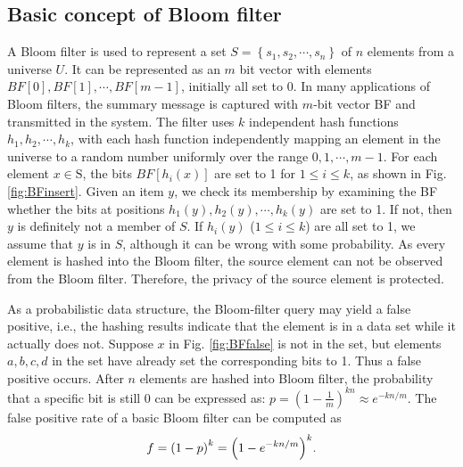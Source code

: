 \documentclass[10pt,journal,compsoc]{IEEEtran}
\begin{document}
\subsection{Basic concept of Bloom filter}
\label{subsec:Basic concept of Bloom filter}
A Bloom filter is used to represent a set $S = \left\{ {{s_1},{s_2}, \cdots ,{s_n}} \right\}$ of $n$ elements from a universe $U$. It can be represented as an $m$ bit vector with elements $BF[0],BF[1], \cdots ,BF\left[ {m - 1} \right]$, initially all set to 0.
In many applications of Bloom filters, the summary message is captured with $m$-bit vector BF and transmitted in the system.
The filter uses $k$ independent hash functions $h_1,h_2, \cdots ,h_k$, with each hash function independently mapping an element in the universe to a random number uniformly over the range ${0,1, \cdots ,m-1}$. For each element ${x} \in {\text{S}}$, the bits $BF[h_i(x)]$ are set to 1 for $1 \le i \le k$, as shown in Fig. \ref{fig:BFinsert}. Given an item $y$, we check its membership by examining the BF whether the bits at positions $h_1(y),h_2(y), \cdots ,h_k(y)$ are set to 1.  If not, then $y$ is definitely not a member of $S$.  If $h_i(y)$ ($1 \le i \le k$) are all set to 1, we assume that $y$ is in $S$, although it can be wrong with some probability. %
As every element is hashed into the Bloom filter, the source element can not be observed from the Bloom filter. Therefore, the privacy of the source element is protected.

As a probabilistic data structure, the Bloom-filter query may yield a false positive, i.e., the hashing results indicate that the element is in a data set while it actually does not. Suppose $x$ in Fig. \ref{fig:BFfalse} is not in the set, but elements $a, b, c, d$ in the set have already set the corresponding bits to 1. Thus a false positive occurs. After $n$ elements are hashed into Bloom filter, the probability that a specific bit is still 0 can be expressed as: $p = {\left( {1 - \frac{1}{m}} \right)^{kn}} \approx {e^{ - kn/m}}$. The false positive rate of a basic Bloom filter can be computed as
\begin{equation}
\footnotesize
f = {\left( {1 - p} \right)^k} = {\left( {1 - {e^{ - kn/m}}} \right)^k}.
\label{eq:false positive}
\end{equation}

\end{document}
